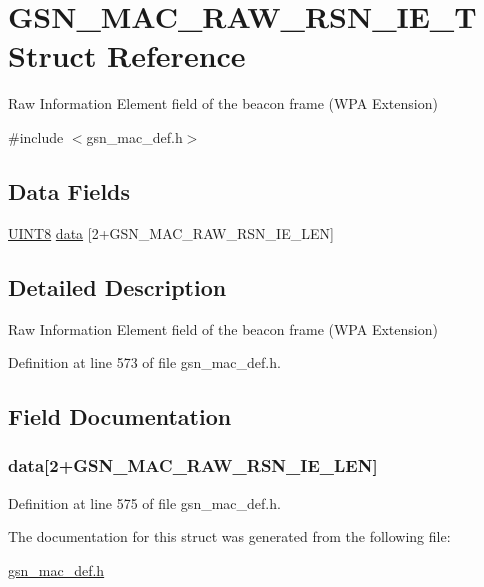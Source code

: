 \hypertarget{a00126}{
\section{GSN\_\-MAC\_\-RAW\_\-RSN\_\-IE\_\-T Struct Reference}
\label{a00126}
}


Raw Information Element field of the beacon frame (WPA Extension)  




{\ttfamily \#include $<$gsn\_\-mac\_\-def.h$>$}

\subsection*{Data Fields}
\begin{DoxyCompactItemize}
\item 
\hyperlink{a00660_gab27e9918b538ce9d8ca692479b375b6a}{UINT8} \hyperlink{a00126_aca842c50759d95bba1379dcf06d5fbc6}{data} \mbox{[}2+GSN\_\-MAC\_\-RAW\_\-RSN\_\-IE\_\-LEN\mbox{]}
\end{DoxyCompactItemize}


\subsection{Detailed Description}
Raw Information Element field of the beacon frame (WPA Extension) 

Definition at line 573 of file gsn\_\-mac\_\-def.h.



\subsection{Field Documentation}
\hypertarget{a00126_aca842c50759d95bba1379dcf06d5fbc6}{
\subsubsection[{data}]{ {\bf data}\mbox{[}2+GSN\_\-MAC\_\-RAW\_\-RSN\_\-IE\_\-LEN\mbox{]}}}
\label{a00126_aca842c50759d95bba1379dcf06d5fbc6}


Definition at line 575 of file gsn\_\-mac\_\-def.h.



The documentation for this struct was generated from the following file:\begin{DoxyCompactItemize}
\item 
\hyperlink{a00522}{gsn\_\-mac\_\-def.h}\end{DoxyCompactItemize}
